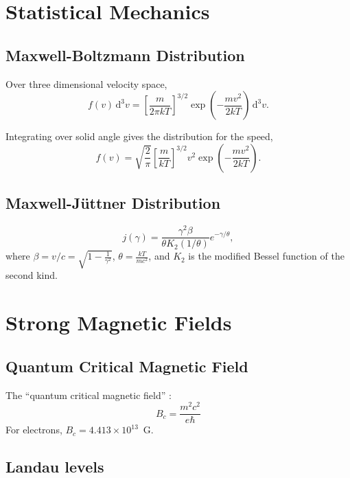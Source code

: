 \documentclass{book}
\begin{document}
\chapter{Statistical Mechanics}

\section{Maxwell-Boltzmann Distribution}

Over three dimensional velocity space,
\begin{equation}
    f(v) \, \text{d}^3 v = \left[\frac{m}{2\pi kT}\right]^{3/2} \exp\left(-\frac{mv^2}{2kT}\right) \, \text{d}^3 v.
\end{equation}

Integrating over solid angle gives the distribution for the speed,
\begin{equation}
    f(v) = \sqrt{\frac{2}{\pi}} \left[ \frac{m}{kT} \right]^{3/2} v^2 \exp\left(-\frac{mv^2}{2kT}\right).
\end{equation}

\section{Maxwell-J\"uttner Distribution}
\label{sec:maxwell-juttner-distribution}

\begin{equation}
    j(\gamma) = \frac{\gamma^2 \beta}{\theta K_2(1/\theta)} e^{-\gamma/\theta},
\end{equation}
where $\beta = v/c = \sqrt{1 - \frac{1}{\gamma^2}}$, $\theta = \frac{kT}{mc^2}$, and $K_2$ is the modified Bessel function of the second kind.

\chapter{Strong Magnetic Fields}

\section{Quantum Critical Magnetic Field}
\label{sec:qcmf}

The ``quantum critical magnetic field'' \citep[translated to SI units from][]{Diachenko2017}:
\begin{equation}
    B_c = \frac{m^2c^2}{e\hbar}
\end{equation}
For electrons, $B_c = 4.413\times10^{13}\,$ G.

\section{Landau levels}
\end{document}

